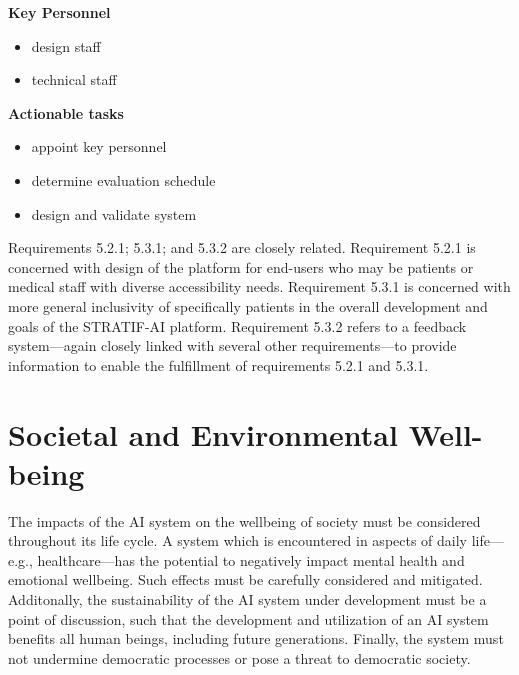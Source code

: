 \documentclass[
  letterpaper,
  DIV=11,
  numbers=noendperiod]{scrreport}
\providecommand{\tightlist}{%
  \setlength{\itemsep}{0pt}\setlength{\parskip}{0pt}}\usepackage{longtable,booktabs,array}
\begin{document}
\textbf{Key Personnel}

\begin{itemize}
\tightlist
\item
  design staff
\item
  technical staff
\end{itemize}

\textbf{Actionable tasks}

\begin{itemize}
\tightlist
\item
  appoint key personnel
\item
  determine evaluation schedule
\item
  design and validate system
\end{itemize}

\begin{tcolorbox}[enhanced jigsaw, arc=.35mm, breakable, coltitle=black, toptitle=1mm, colbacktitle=quarto-callout-note-color!10!white, toprule=.15mm, left=2mm, bottomrule=.15mm, opacitybacktitle=0.6, titlerule=0mm, colback=white, opacityback=0, title=\textcolor{quarto-callout-note-color}{\faInfo}\hspace{0.5em}{Note}, bottomtitle=1mm, colframe=quarto-callout-note-color-frame, leftrule=.75mm, rightrule=.15mm]

Requirements 5.2.1; 5.3.1; and 5.3.2 are closely related. Requirement
5.2.1 is concerned with design of the platform for end-users who may be
patients or medical staff with diverse accessibility needs. Requirement
5.3.1 is concerned with more general inclusivity of specifically
patients in the overall development and goals of the STRATIF-AI
platform. Requirement 5.3.2 refers to a feedback system---again closely
linked with several other requirements---to provide information to
enable the fulfillment of requirements 5.2.1 and 5.3.1.

\end{tcolorbox}


\hypertarget{societal-and-environmental-well-being}{%
\chapter{Societal and Environmental
Well-being}\label{societal-and-environmental-well-being}}

The impacts of the AI system on the wellbeing of society must be
considered throughout its life cycle. A system which is encountered in
aspects of daily life---e.g., healthcare---has the potential to
negatively impact mental health and emotional wellbeing. Such effects
must be carefully considered and mitigated. Additonally, the
sustainability of the AI system under development must be a point of
discussion, such that the development and utilization of an AI system
benefits all human beings, including future generations. Finally, the
system must not undermine democratic processes or pose a threat to
democratic society.
\end{document}
